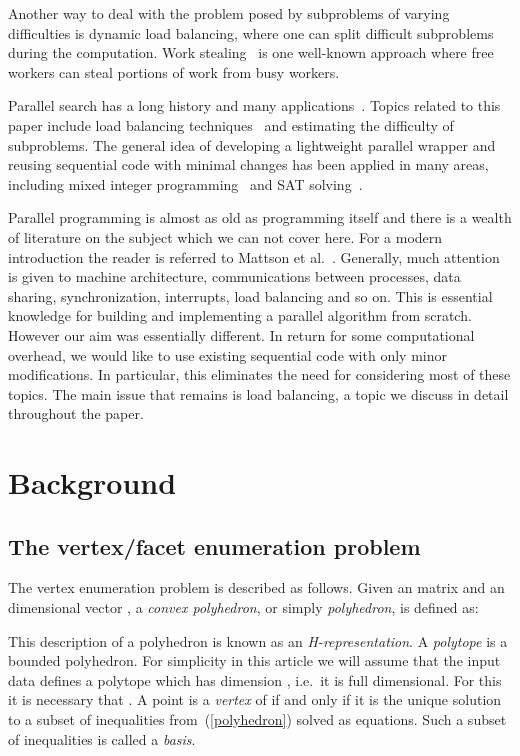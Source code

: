 \documentclass[a4paper,11pt]{article}   \usepackage{authblk} \usepackage[top=1.9cm,bottom=1.9cm,left=1.9cm,right=1.9cm]{geometry}
\begin{document}
Another way to deal with the problem posed by subproblems 
of varying difficulties is dynamic load balancing, where one
can split difficult subproblems during the computation.  Work
stealing~\cite{BL99} is one well-known approach where free workers
can steal portions of work from busy workers.

Parallel search has a long history and many applications~\cite{GK99}.
Topics related to this paper include load balancing techniques~\cite{KGR94,KR87} and estimating the difficulty of
subproblems.  The general idea of developing a lightweight parallel wrapper and
reusing sequential code with minimal changes has been applied in many areas,
including mixed integer programming~\cite{SABHK12} and SAT solving~\cite{BSS15}.

Parallel programming is almost as old as programming itself and there is a wealth of literature
on the subject which we can not cover here. For a modern introduction the reader is referred to Mattson et al.~\cite{MSM}.
Generally, much attention is given to machine architecture, communications between processes,
data sharing, synchronization, interrupts, load balancing and so on. This is essential knowledge for building and
implementing a parallel algorithm from scratch. However our aim was essentially different.
In return for some computational overhead, we would like to use existing sequential code with only
minor modifications. In particular, this eliminates the need for considering most of these topics.
The main issue that remains is load balancing, a topic we discuss in detail throughout the paper.

\section{Background}
\label{sect:back}
\subsection{The vertex/facet enumeration problem}
\label{sect:ve}
The vertex enumeration problem is described as follows.
Given an  matrix  and an  dimensional vector
, a
\emph{convex polyhedron}, or simply \emph{polyhedron},  is defined as:

This description of a polyhedron is known as an \emph{H-representation}.
A \emph{polytope} is a bounded polyhedron. For simplicity in this article
we will assume that the input data  defines 
a polytope which has dimension , i.e.\ it is
full dimensional.
For this it is necessary that . 
A point  is a \emph{vertex} of  if and only if
it is the unique solution to a subset of  inequalities from~(\ref{polyhedron})
solved as equations. Such a subset of inequalities is called a {\em basis}.
\end{document}
